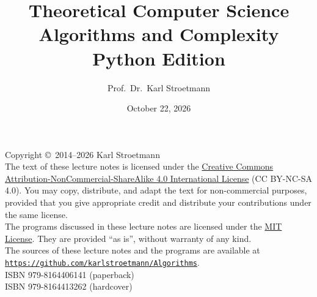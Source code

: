 \documentclass[twoside]{report}
\title{Theoretical Computer Science \\
       Algorithms and Complexity \\[0.3cm]
       {\large Python Edition}}
\author{Prof.~Dr.~Karl Stroetmann}
\date{October 22, 2026}
\theoremstyle{plain}
\begin{document}
\maketitle
\newpage
\thispagestyle{empty}
\vspace*{\fill}
\noindent
Copyright \copyright\ 2014--2026 Karl Stroetmann
\\[0.3cm]
The text of these lecture notes is licensed under the
\href{https://creativecommons.org/licenses/by-nc-sa/4.0/}{Creative Commons
Attribution-NonCommercial-ShareAlike 4.0 International License} (CC BY-NC-SA 4.0).
You may copy, distribute, and adapt the text for non-commercial purposes, provided that
you give appropriate credit and distribute your contributions under the same license.
\\[0.3cm]
The programs discussed in these lecture notes are licensed under the
\href{https://opensource.org/license/mit}{MIT License}.  They are provided ``as is'',
without warranty of any kind.
\\[0.3cm]
The sources of these lecture notes and the programs are available at
\\[0.2cm]
\hspace*{\fill}
\href{https://github.com/karlstroetmann/Algorithms}{\texttt{https://github.com/karlstroetmann/Algorithms}}.
\hspace*{\fill}
\\[0.3cm]
ISBN 979-8164406141 (paperback)
\\
ISBN 979-8164413262 (hardcover)
\tableofcontents

















\listoffigures
\printindex
\end{document}

